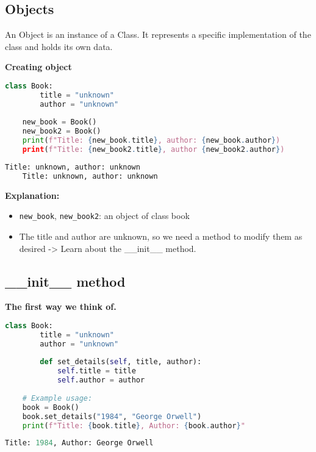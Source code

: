 \subsection{Objects}
An Object is an instance of a Class. It represents a specific implementation of the class and holds its own data.

\textbf{Creating object}
\begin{lstlisting}[language=python, caption={creating object}]
	class Book:
		title = "unknown"
		author = "unknown"
	
	new_book = Book()
	new_book2 = Book()
	print(f"Title: {new_book.title}, author: {new_book.author})
	print(f"Title: {new_book2.title}, author {new_book2.author})
\end{lstlisting}

\begin{lstlisting}[language=python,caption={Output object}]
	Title: unknown, author: unknown
	Title: unknown, author: unknown
\end{lstlisting}

\textbf{Explanation:}
\begin{itemize}
	\item \texttt{new\_book}, \texttt{new\_book2}: an object of class book
	\item The title and author are unknown, so we need a method to modify them as desired -> Learn about the \_\_init\_\_ method.
\end{itemize}

\subsection{\_\_init\_\_ method}
\textbf{The first way we think of.}
\begin{lstlisting}[language=python]
	class Book:
		title = "unknown"
		author = "unknown"
	
		def set_details(self, title, author):
			self.title = title
			self.author = author
	
	# Example usage:
	book = Book()
	book.set_details("1984", "George Orwell")
	print(f"Title: {book.title}, Author: {book.author}"
\end{lstlisting}


\begin{lstlisting}[language=python]
	Title: 1984, Author: George Orwell
\end{lstlisting}

